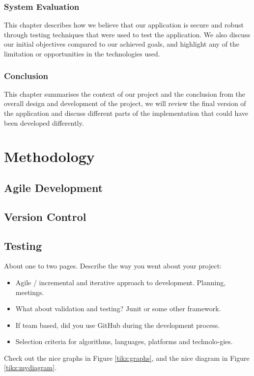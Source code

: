 \subsection{System Evaluation}
This chapter describes how we believe that our application is secure and robust through testing techniques that were used to test the application. We also discuss our initial objectives compared to our achieved goals, and highlight any of the limitation or opportunities in the technologies used.

\subsection{Conclusion}
This chapter summarises the context of our project and the conclusion from the overall design and development of the project, we will review the final version of the application and discuss different parts of the implementation that could have been developed differently.

\chapter{Methodology}

\section{Agile Development}

\section{Version Control}

\section{Testing}

About one to two pages.
Describe the way you went about your project:
\begin{itemize}
\item Agile / incremental and iterative approach to development. Planning, meetings.
\item What about validation and testing? Junit or some other framework.
\item If team based, did you use GitHub during the development process.
\item Selection criteria for algorithms, languages, platforms and technolo-gies.
\end{itemize}
Check out the nice graphs in Figure \ref{tikz:graphs}, and the nice diagram in Figure \ref{tikz:mydiagram}.

